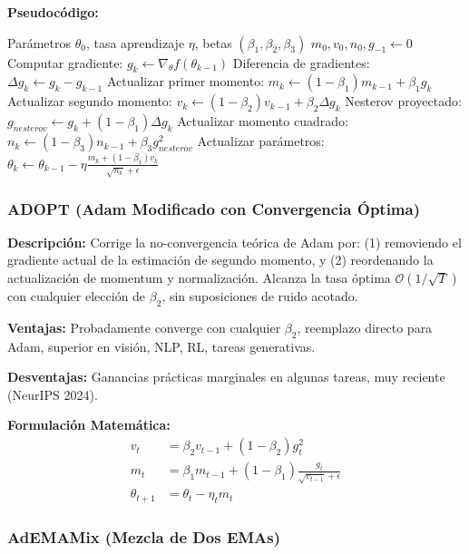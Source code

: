 \documentclass[11pt,a4paper]{article}
\begin{document}
\textbf{Pseudocódigo:}
\begin{algorithm}
\caption{Adan --- Momentum Nesterov Adaptivo}
\begin{algorithmic}[1]
\Require Parámetros $\theta_0$, tasa aprendizaje $\eta$, betas $(\beta_1, \beta_2, \beta_3)$
\State $m_0, v_0, n_0, g_{-1} \gets 0$
\State Computar gradiente: $g_k \gets \nabla_\theta f(\theta_{k-1})$
\State Diferencia de gradientes: $\Delta g_k \gets g_k - g_{k-1}$
\State Actualizar primer momento: $m_k \gets (1-\beta_1) m_{k-1} + \beta_1 g_k$
\State Actualizar segundo momento: $v_k \gets (1-\beta_2) v_{k-1} + \beta_2 \Delta g_k$
\State Nesterov proyectado: $g_{nesterov} \gets g_k + (1-\beta_1) \Delta g_k$
\State Actualizar momento cuadrado: $n_k \gets (1-\beta_3) n_{k-1} + \beta_3 g_{nesterov}^2$
\State Actualizar parámetros: $\theta_k \gets \theta_{k-1} - \eta \frac{m_k + (1-\beta_1)v_k}{\sqrt{n_k}+\epsilon}$
\EndFor
\end{algorithmic}
\end{algorithm}

\subsubsection{ADOPT (Adam Modificado con Convergencia Óptima)}

\textbf{Descripción:} Corrige la no-convergencia teórica de Adam por: (1) removiendo el gradiente actual de la estimación de segundo momento, y (2) reordenando la actualización de momentum y normalización. Alcanza la tasa óptima $\mathcal{O}(1/\sqrt{T})$ con cualquier elección de $\beta_2$, sin suposiciones de ruido acotado.

\textbf{Ventajas:} Probadamente converge con cualquier $\beta_2$, reemplazo directo para Adam, superior en visión, NLP, RL, tareas generativas.

\textbf{Desventajas:} Ganancias prácticas marginales en algunas tareas, muy reciente (NeurIPS 2024).

\textbf{Formulación Matemática:}
\begin{align}
v_t &= \beta_2 v_{t-1} + (1 - \beta_2) g_t^2 \\
m_t &= \beta_1 m_{t-1} + (1 - \beta_1) \frac{g_t}{\sqrt{v_{t-1}} + \epsilon} \\
\theta_{t+1} &= \theta_t - \eta_t m_t
\end{align}

\subsubsection{AdEMAMix (Mezcla de Dos EMAs)}
\end{document}
